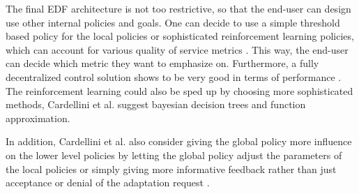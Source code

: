         \quad The final EDF architecture is not too restrictive, so that the end-user can design use other internal policies and goals. 
        One can decide to use a simple threshold based policy for the local policies or sophisticated reinforcement learning policies, which can account for various 
        quality of service metrics \cite[p. 184]{cardellini}. This way, the end-user can decide which metric they want to emphasize on.
        Furthermore, a fully decentralized control solution shows to be very good in terms of performance \cite[p. 184]{cardellini}.
        The reinforcement learning could also be sped up by choosing more sophisticated methods, Cardellini et al. suggest bayesian decision trees and function approximation.

        \quad In addition, Cardellini et al. also consider giving the global policy more influence on the lower level policies by letting the 
        global policy adjust the parameters of the local policies or simply giving more informative feedback rather than just acceptance or denial of the adaptation request \cite[p. 184]{cardellini}.